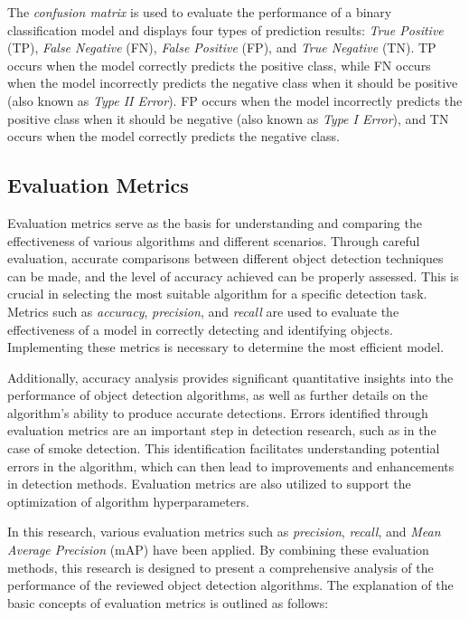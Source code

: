 The \emph{confusion matrix} is used to evaluate the performance of a binary classification model and displays four types of prediction results: \emph{True Positive} (TP), \emph{False Negative} (FN), \emph{False Positive} (FP), and \emph{True Negative} (TN). TP occurs when the model correctly predicts the positive class, while FN occurs when the model incorrectly predicts the negative class when it should be positive (also known as \emph{Type II Error}). FP occurs when the model incorrectly predicts the positive class when it should be negative (also known as \emph{Type I Error}), and TN occurs when the model correctly predicts the negative class.

\subsection{Evaluation Metrics}
\label{subsec:Evaluation Metrics}

Evaluation metrics serve as the basis for understanding and comparing the effectiveness of various algorithms and different scenarios. Through careful evaluation, accurate comparisons between different object detection techniques can be made, and the level of accuracy achieved can be properly assessed. This is crucial in selecting the most suitable algorithm for a specific detection task. Metrics such as \emph{accuracy}, \emph{precision}, and \emph{recall} are used to evaluate the effectiveness of a model in correctly detecting and identifying objects. Implementing these metrics is necessary to determine the most efficient model.

Additionally, accuracy analysis provides significant quantitative insights into the performance of object detection algorithms, as well as further details on the algorithm's ability to produce accurate detections. Errors identified through evaluation metrics are an important step in detection research, such as in the case of smoke detection. This identification facilitates understanding potential errors in the algorithm, which can then lead to improvements and enhancements in detection methods. Evaluation metrics are also utilized to support the optimization of algorithm hyperparameters.

In this research, various evaluation metrics such as \emph{precision}, \emph{recall}, and \emph{Mean Average Precision} (mAP) have been applied. By combining these evaluation methods, this research is designed to present a comprehensive analysis of the performance of the reviewed object detection algorithms. The explanation of the basic concepts of evaluation metrics is outlined as follows:

